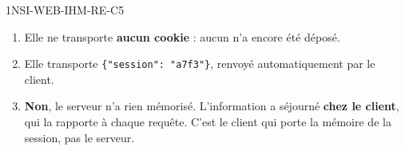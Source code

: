 \begin{corrige}{1NSI-WEB-IHM-RE-C5}
\begin{enumerate}
  \item Elle ne transporte \textbf{aucun cookie} : aucun n'a encore été déposé.
  \item Elle transporte \lstinline|{"session": "a7f3"}|, renvoyé automatiquement par le client.
  \item \textbf{Non}, le serveur n'a rien mémorisé. L'information a séjourné \textbf{chez le
        client}, qui la rapporte à chaque requête. C'est le client qui porte la mémoire de la
        session, pas le serveur.
\end{enumerate}
\end{corrige}
